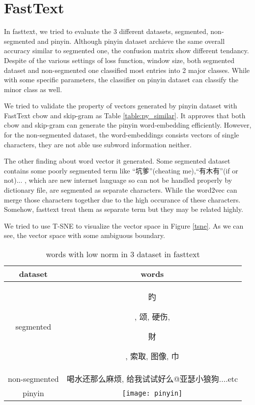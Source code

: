 \section{FastText}

In fasttext, we tried to evaluate the 3 different datasets, segmented, non-segmented and pinyin. 
Although pinyin dataset archieve the same overall accuracy similar to segmented one, the confusion matrix show different tendancy.
Despite of the various settings of loss function, window size, both segmented dataset and non-segmented one classified most entries into 2 major classes.
While with some specific parameters, the classifier on pinyin dataset can classify the minor class as well. 

We tried to validate the property of vectors generated by pinyin dataset with FastText cbow and skip-gram as Table \ref{table:py_similar}. 
It approves that both cbow and skip-gram can generate the pinyin word-embedding efficiently. 
However, for the non-segmented dataset, the word-embeddings consists vectors of single characters, they are not able use subword information neither.

The other finding about word vector it generated. Some segmented dataset contains some poorly segmented term like \enquote{坑爹}(cheating me),\enquote{有木有}(if or not)... 
, which are new internet language so can not be handled properly by dictionary file, are segmented as separate characters.  
While the word2vec can merge those characters together due to the high occurance of these characters. 
Somehow, fasttext treat them as separate term but they may be related highly.

We tried to use T-SNE to visualize the vector space in Figure \ref{tsne}. As we can see, the vector space with some ambiguous boundary.


\begin{CJK}{UTF8}{gbsn}
\begin{table}[]
\centering
\caption{words with low norm in 3 dataset in fasttext}
\label{table:lownorm}
\begin{tabular}{|c|c|}
\hline
 dataset  & words  \\
\hline
segmented  & \begin{CJK}{UTF8}{bkai} 旳\end{CJK}, 颂, 硬伤, \begin{CJK}{UTF8}{bkai}財\end{CJK}, 索取, 图像, 巾 \\
non-segmented  & 喝水还那么麻烦, 给我试试好么@亚瑟小狼狗....etc   \\
pinyin     &         \texttt{[image: pinyin]} \\   
\hline
\end{tabular}
\end{table}
\end{CJK}

